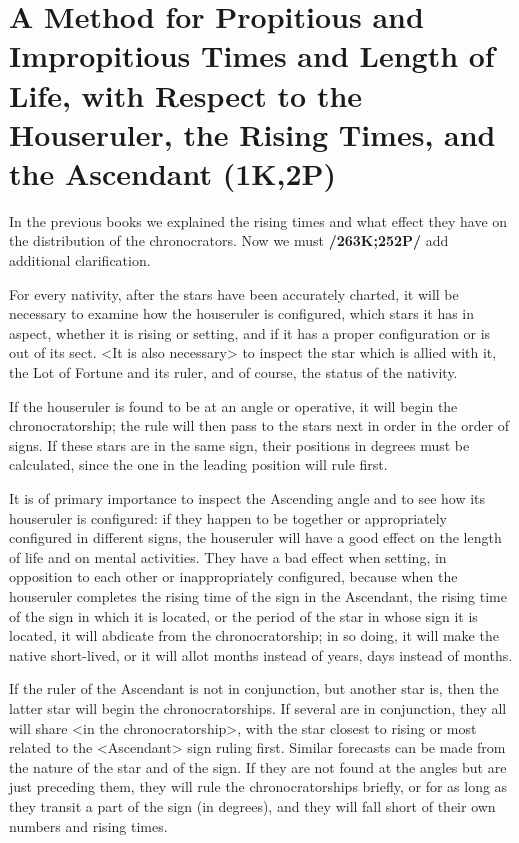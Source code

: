 \section{A Method for Propitious and Impropitious Times and Length of Life, with Respect to the Houseruler, the Rising Times, and the Ascendant (1K,2P)}

In the previous books we explained the rising times and what effect they have on the distribution of the chronocrators. Now we must \textbf{/263K;252P/} add additional clarification. 

For \mndl every nativity, after the stars  have been accurately charted, it will be necessary to examine how the houseruler is configured, which stars
it has in aspect, whether it is rising or setting, and if it has a proper configuration or is out of its sect. <It is also necessary> to inspect the star which is allied with it, the Lot of Fortune and its ruler, and of course, the status of the nativity.

If the houseruler is found to be at an angle or operative, it will begin the chronocratorship; the rule will then pass to the stars next in order in the order of signs. If these stars are in the same sign, their positions
in degrees must be calculated, since the one in the leading position will rule first. 

It is of primary importance to inspect the Ascending angle and to see how its houseruler is configured: if they happen to be together or appropriately configured in different signs, the houseruler will have a good effect on the length of life and on mental activities. They have a bad effect when setting, in opposition to each other or inappropriately configured, because when the houseruler completes the rising time of the sign in the Ascendant, the rising time of the sign in which it is located, or the period of the star in whose sign it is located, it will abdicate from the chronocratorship; in so doing, it will make the native short-lived, or it will allot months instead of years, days instead of months.

If the ruler of the Ascendant is not in conjunction, but another star is, then the latter star will begin the chronocratorships. If several are in conjunction, they all will share <in the chronocratorship>, with the star closest to rising or most related to the <Ascendant> sign ruling first. Similar forecasts can be made from the nature of the star and of the sign. If they are not found at the angles but are just preceding them, they will rule the chronocratorships briefly, or for as long as they transit a part of the sign (in degrees), and they will fall short of their own numbers and rising times.

